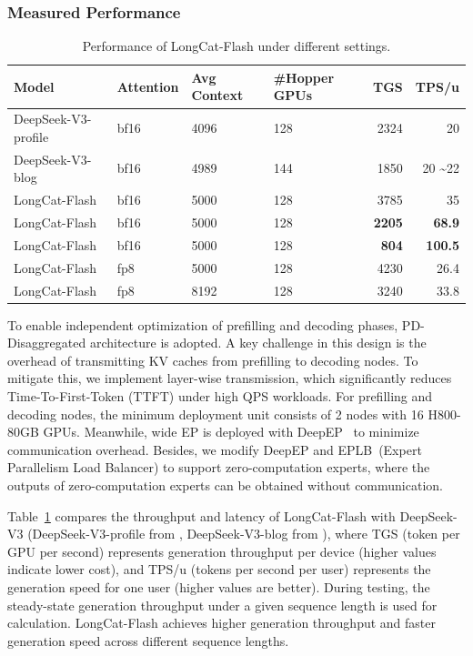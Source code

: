 \documentclass{article}
\newcommand{\longcat}{LongCat-Flash\xspace}
\begin{document}
\subsubsection{Measured Performance}

\begin{table}[h]
\centering
\caption{Performance of \longcat under different settings.}

\begin{tabular}{llllrr}
\toprule
\textbf{Model} & \textbf{Attention} & \textbf{Avg Context} & \textbf{\#Hopper GPUs} & \textbf{TGS} &\textbf{TPS/u} \\
\midrule
DeepSeek-V3-profile & bf16  & 4096 & 128 & 2324 & 20 \\
DeepSeek-V3-blog & bf16  & 4989 & 144 & 1850 & 20 \textasciitilde 22 \\
\longcat & bf16  & 5000 & 128 & 3785 & 35 \\
\longcat & bf16  & 5000 & 128 & \textbf{2205} & \textbf{68.9} \\
\longcat & bf16  & 5000 & 128 & \textbf{804} & \textbf{100.5} \\
\longcat & fp8  & 5000 & 128 & 4230 & 26.4 \\
\longcat & fp8  & 8192 & 128 & 3240 & 33.8 \\
\bottomrule
\end{tabular}

\label{table:precision}
\end{table}

To enable independent optimization of prefilling and decoding phases, PD-Disaggregated architecture is adopted. A key challenge in this design is the overhead of transmitting KV caches from prefilling to decoding nodes. To mitigate this, we implement layer-wise transmission, which significantly reduces Time-To-First-Token (TTFT) under high QPS workloads. For prefilling and decoding nodes, the minimum deployment unit consists of 2 nodes with 16 H800-80GB GPUs. Meanwhile, wide EP is deployed with DeepEP~\citep{deepep2025} to minimize communication overhead. Besides, we modify DeepEP and EPLB~(Expert Parallelism Load Balancer) to support zero-computation experts, where the outputs of zero-computation experts can be obtained without communication. 

Table~\ref{table:precision} compares the throughput and latency of \longcat with DeepSeek-V3 (DeepSeek-V3-profile from \citet{DeepSeekprofile}, DeepSeek-V3-blog from \citet{DeepSeekblog} ), where TGS (token per GPU per second) represents generation throughput per device (higher values indicate lower cost), and TPS/u (tokens per second per user) represents the generation speed for one user (higher values are better). During testing, the steady-state generation throughput under a given sequence length is used for calculation. \longcat achieves higher generation throughput and faster generation speed across different sequence lengths. 
\end{document}
